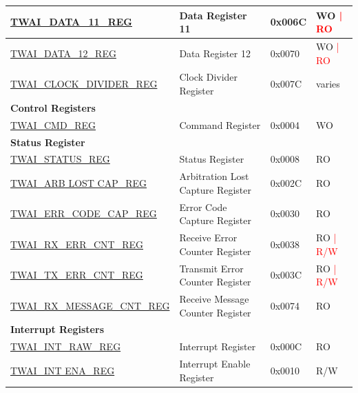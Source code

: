 \begin{longtable}{ | p{6cm} | p{6cm} | p{1.3cm} | p{2cm} | }
\hyperref[regdesc:TWAIDATA11REG]{TWAI\_DATA\_11\_REG} & Data Register 11 & 0x006C & WO \textcolor{red}{| RO} \\ \hline
\hyperref[regdesc:TWAIDATA12REG]{TWAI\_DATA\_12\_REG} & Data Register 12 & 0x0070 & WO \textcolor{red}{| RO} \\ \hline
\hyperref[regdesc:TWAICLOCKDIVIDERREG]{TWAI\_CLOCK\_DIVIDER\_REG} & Clock Divider Register & 0x007C & varies \\ \hline
\multicolumn{4}{|l|}{\textbf{Control Registers}} \\ \hline
\hyperref[regdesc:TWAICMDREG]{TWAI\_CMD\_REG} & Command Register & 0x0004 & WO \\ \hline
\multicolumn{4}{|l|}{\textbf{Status Register}} \\ \hline
\hyperref[regdesc:TWAISTATUSREG]{TWAI\_STATUS\_REG} & Status Register & 0x0008 & RO \\ \hline
\hyperref[regdesc:TWAIARB LOST CAPREG]{TWAI\_ARB LOST CAP\_REG} & Arbitration Lost Capture Register & 0x002C & RO \\ \hline
\hyperref[regdesc:TWAIERRCODECAPREG]{TWAI\_ERR\_CODE\_CAP\_REG} & Error Code Capture Register & 0x0030 & RO \\ \hline
\hyperref[regdesc:TWAIRXERRCNTREG]{TWAI\_RX\_ERR\_CNT\_REG} & Receive Error Counter Register & 0x0038 & RO \textcolor{red}{| R/W} \\ \hline
\hyperref[regdesc:TWAITXERRCNTREG]{TWAI\_TX\_ERR\_CNT\_REG} & Transmit Error Counter Register & 0x003C & RO \textcolor{red}{| R/W} \\ \hline
\hyperref[regdesc:TWAIRXMESSAGECNTREG]{TWAI\_RX\_MESSAGE\_CNT\_REG} & Receive Message Counter Register & 0x0074 & RO \\ \hline
\multicolumn{4}{|l|}{\textbf{Interrupt Registers}} \\ \hline
\hyperref[regdesc:TWAIINTRAWREG]{TWAI\_INT\_RAW\_REG} & Interrupt Register & 0x000C & RO \\ \hline
\hyperref[regdesc:TWAIINT ENAREG]{TWAI\_INT ENA\_REG} & Interrupt Enable Register & 0x0010 & R/W \\ \hline
\end{longtable}
